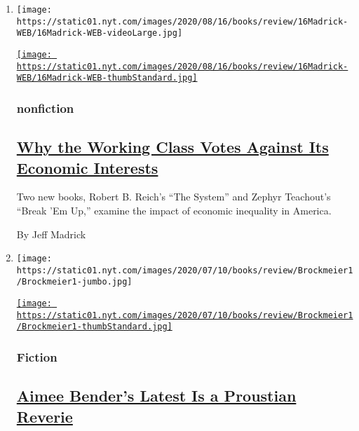 \begin{enumerate}
\def\labelenumi{\arabic{enumi}.}
\item
  \texttt{[image: https://static01.nyt.com/images/2020/08/16/books/review/16Madrick-WEB/16Madrick-WEB-videoLarge.jpg]}

  \href{/2020/07/31/books/review/the-system-robert-reich-break-em-up-zephyr-teachout.html}{\texttt{[image: https://static01.nyt.com/images/2020/08/16/books/review/16Madrick-WEB/16Madrick-WEB-thumbStandard.jpg]}}

  \hypertarget{nonfiction}{%
  \subsubsection{nonfiction}\label{nonfiction}}

  \hypertarget{why-the-working-class-votes-against-its-economic-interests}{%
  \subsection{\texorpdfstring{\href{/2020/07/31/books/review/the-system-robert-reich-break-em-up-zephyr-teachout.html}{Why
  the Working Class Votes Against Its Economic
  Interests}}{Why the Working Class Votes Against Its Economic Interests}}\label{why-the-working-class-votes-against-its-economic-interests}}

  Two new books, Robert B. Reich's ``The System'' and Zephyr Teachout's
  ``Break 'Em Up,'' examine the impact of economic inequality in
  America.

  By Jeff Madrick
\item
  \texttt{[image: https://static01.nyt.com/images/2020/07/10/books/review/Brockmeier1/Brockmeier1-jumbo.jpg]}

  \href{/2020/07/28/books/review/aimee-bender-the-butterfly-lampshade.html}{\texttt{[image: https://static01.nyt.com/images/2020/07/10/books/review/Brockmeier1/Brockmeier1-thumbStandard.jpg]}}

  \hypertarget{fiction}{%
  \subsubsection{Fiction}\label{fiction}}

  \hypertarget{aimee-benders-latest-is-a-proustian-reverie}{%
  \subsection{\texorpdfstring{\href{/2020/07/28/books/review/aimee-bender-the-butterfly-lampshade.html}{Aimee
  Bender's Latest Is a Proustian
  Reverie}}{Aimee Bender's Latest Is a Proustian Reverie}}\label{aimee-benders-latest-is-a-proustian-reverie}}


\end{enumerate}
